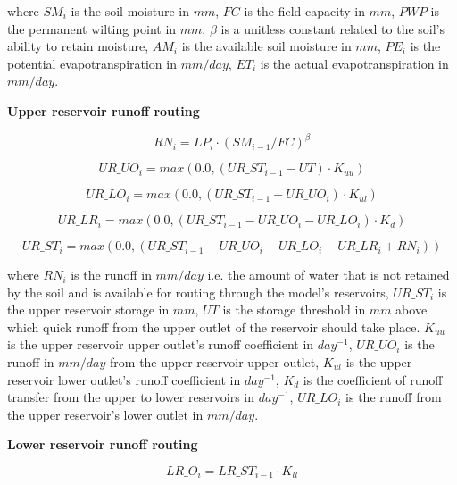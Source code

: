 \begin{fleqn}
where $SM_i$ is the soil moisture in $mm$, $FC$ is the field capacity in $mm$, $PWP$ is the permanent wilting point in $mm$, $\beta$ is a unitless constant related to the soil's ability to retain moisture, $AM_i$ is the available soil moisture in $mm$, $PE_i$ is the potential evapotranspiration in $mm/day$, $ET_i$ is the actual evapotranspiration in $mm/day$.

\bigskip
\textbf{Upper reservoir runoff routing}

\begin{equation}
RN_i = LP_i \cdot (SM_{i-1} / FC)^{\beta}
\end{equation}

\begin{equation}
UR\_UO_i = max(0.0, (UR\_ST_{i-1} - UT) \cdot K_{uu})
\end{equation}

\begin{equation}
UR\_LO_i = max(0.0, (UR\_ST_{i-1} - UR\_UO_i) \cdot K_{ul})
\end{equation}

\begin{equation}
UR\_LR_i = max(0.0, (UR\_ST_{i-1} - UR\_UO_i - UR\_LO_i) \cdot K_d)
\end{equation}

\begin{equation}
UR\_ST_i = max(0.0, (UR\_ST_{i-1} - UR\_UO_i - UR\_LO_i - UR\_LR_i + RN_i))
\end{equation}

where $RN_i$ is the runoff in $mm/day$ i.e. the amount of water that is not retained by the soil and is available for routing through the model's reservoirs, $UR\_ST_i$ is the upper reservoir storage in $mm$, $UT$ is the storage threshold in $mm$ above which quick runoff from the upper outlet of the reservoir should take place. $K_{uu}$ is the upper reservoir upper outlet's runoff coefficient in $day^{-1}$, $UR\_UO_i$ is the runoff in $mm/day$ from the upper reservoir upper outlet, $K_{ul}$ is the upper reservoir lower outlet's runoff coefficient in  $day^{-1}$, $K_d$ is the coefficient of runoff transfer from the upper to lower reservoirs in $day^{-1}$, $UR\_LO_i$ is the runoff from the upper reservoir's lower outlet in $mm/day$.

\bigskip
\textbf{Lower reservoir runoff routing}

\begin{equation}
LR\_O_i = LR\_ST_{i-1} \cdot K_{ll}
\end{equation}


\end{fleqn}
